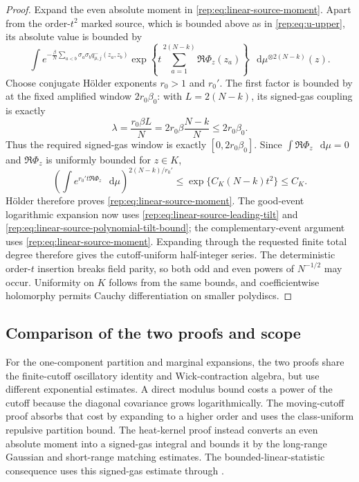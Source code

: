 \documentclass[11pt,reqno]{amsart}
\numberwithin{equation}{section}
\theoremstyle{plain}
\theoremstyle{definition}
\newcommand{\dd}{\mathop{}\!\mathrm d}
\newcommand{\be}{\beta}
\begin{document}
\begin{proof}
Expand the even absolute moment in \eqref{rep:eq:linear-source-moment}.  Apart from the order-$t^2$ marked source, which is bounded above as in \eqref{rep:eq:u-upper}, its absolute value is bounded by
\begin{equation}\label{rep:eq:linear-source-even-moment}
 \int e^{-\frac\be N\sum_{a<b}\sigma_a\sigma_bq^-_{\mu,j}(z_a,z_b)}
 \exp\left\{t\sum_{a=1}^{2(N-k)}\Re\Phi_z(z_a)\right\}
 \,\dd\mu^{\otimes2(N-k)}(z).
\end{equation}
Choose conjugate H\"older exponents $r_0>1$ and $r_0'$.  The first factor is bounded by  at the fixed amplified window $2r_0\be_0$: with $L=2(N-k)$, its signed-gas coupling is exactly
\begin{equation}\label{rep:eq:linear-source-signed-window}
 \lambda=\frac{r_0\be L}{N}
 =2r_0\be\frac{N-k}{N}
 \le 2r_0\be_0.
\end{equation}
Thus the required signed-gas window is exactly $[0,2r_0\be_0]$.  Since $\int\Re\Phi_z\,\dd\mu=0$ and $\Re\Phi_z$ is uniformly bounded for $z\in K$,
\begin{equation}\label{rep:eq:linear-source-product-bound}
 \left(\int e^{r_0't\Re\Phi_z}\,\dd\mu\right)^{2(N-k)/r_0'}
 \le \exp\{C_K(N-k)t^2\}\le C_K.
\end{equation}
H\"older therefore proves \eqref{rep:eq:linear-source-moment}.  The good-event logarithmic expansion now uses
\eqref{rep:eq:linear-source-leading-tilt} and
\eqref{rep:eq:linear-source-polynomial-tilt-bound}; the complementary-event
argument uses \eqref{rep:eq:linear-source-moment}.  Expanding through the requested
finite total degree therefore gives the cutoff-uniform half-integer series.
The deterministic order-$t$ insertion breaks field parity, so both odd and
even powers of $N^{-1/2}$ may occur.  Uniformity on $K$ follows from the same
bounds, and coefficientwise holomorphy permits Cauchy differentiation on
smaller polydiscs.
\end{proof}


\subsection{Comparison of the two proofs and scope}
\label{rep:subsec:signed-scope}

For the one-component partition and marginal expansions, the two proofs share the finite-cutoff oscillatory identity and Wick-contraction algebra, but use different exponential estimates. A direct modulus bound costs a power of the cutoff because the diagonal covariance grows logarithmically. The moving-cutoff proof absorbs that cost by expanding to a higher order and uses the class-uniform repulsive partition bound. The heat-kernel proof instead converts an even absolute moment into a signed-gas integral and bounds it by the long-range Gaussian and short-range matching estimates. The bounded-linear-statistic consequence uses this signed-gas estimate through .
\end{document}
